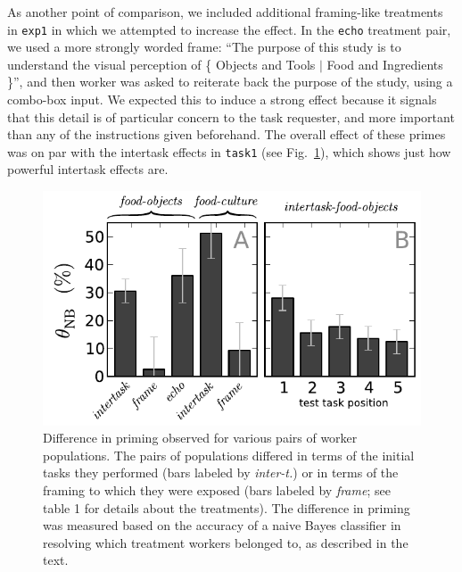 \documentclass[12pt]{article}
\begin{document}
As another point of comparison, we included additional framing-like 
treatments in \texttt{exp1} in which we attempted to increase the effect.
In the \texttt{echo} treatment pair, we used a more strongly worded frame:
``The purpose of this study is to understand the visual perception of
\{ Objects and Tools $\vert$ Food and Ingredients \}'', and then worker was
asked to reiterate back the purpose of the study, using a combo-box input.
We expected this to induce a strong effect because it signals that this detail
is of particular concern to the task requester, and more important than any of 
the instructions given beforehand.  
The overall effect of these primes was on par with the intertask 
effects in \texttt{task1} (see Fig.~\ref{fig:theta}), which shows just how
powerful intertask effects are.

\begin{figure}
	\centering
	\includegraphics[scale=1]{figs/theta.pdf}
	\caption{
		Difference in priming observed for various pairs of worker populations.
		The pairs of populations differed in terms of the initial tasks they
		performed (bars labeled by \textit{inter-t.}) or in terms of the framing
		to which they were exposed (bars labeled by \textit{frame}; see table 1 for
		details about the treatments).  The difference in priming was 
		measured based on the accuracy of a naive Bayes classifier in 
		resolving which treatment workers belonged to, as described in the 
		text.  
	}
	\label{fig:theta}
\end{figure}
\end{document}
